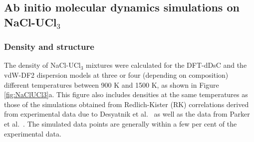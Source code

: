\documentclass[preprint,3p,10pt,onecolumn,number,sort&compress]{elsarticle}
\begin{document}
{%




\FloatBarrier

\subsection{Ab initio molecular dynamics simulations on NaCl-UCl$_3$}
\subsubsection{Density and structure}
The density of NaCl-UCl$_3$ mixtures were calculated for the DFT-dDsC and the vdW-DF2 dispersion models at three or four (depending on composition) different temperatures between 900 K and 1500 K, as shown in Figure \ref{fig:NaClUCl3}a. This figure also includes densities at the same temperatures as those of the simulations obtained from Redlich-Kister (RK) correlations \cite{agca2022} derived from experimental data due to Desyatnik et al.~\cite{Desyatnik} as well as the data from Parker et al.~\cite{Parker}. The simulated data points are generally within a few per cent of the experimental data. 

}
\end{document}
